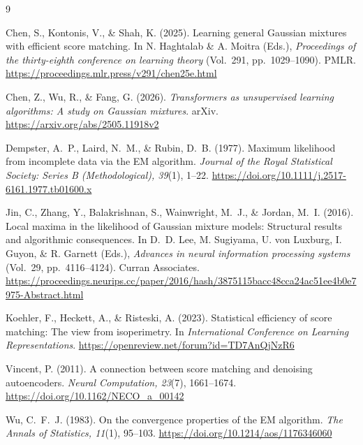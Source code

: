 \documentclass[a4paper,11pt]{article}
\numberwithin{equation}{section}
\begin{document}
\begingroup
\small
\setlength{\parskip}{2pt}
\begin{thebibliography}{9}

Chen, S., Kontonis, V., \& Shah, K. (2025).
Learning general Gaussian mixtures with efficient score matching.
In N. Haghtalab \& A. Moitra (Eds.),
\textit{Proceedings of the thirty-eighth conference on learning theory}
(Vol.~291, pp.~1029--1090). PMLR.
\url{https://proceedings.mlr.press/v291/chen25e.html}

Chen, Z., Wu, R., \& Fang, G. (2026).
\textit{Transformers as unsupervised learning algorithms: A study on Gaussian mixtures}.
arXiv.
\url{https://arxiv.org/abs/2505.11918v2}

Dempster, A.~P., Laird, N.~M., \& Rubin, D.~B. (1977).
Maximum likelihood from incomplete data via the EM algorithm.
\textit{Journal of the Royal Statistical Society: Series B (Methodological), 39}(1), 1--22.
\url{https://doi.org/10.1111/j.2517-6161.1977.tb01600.x}

Jin, C., Zhang, Y., Balakrishnan, S., Wainwright, M.~J., \& Jordan, M.~I. (2016).
Local maxima in the likelihood of Gaussian mixture models: Structural results and algorithmic consequences.
In D.~D. Lee, M. Sugiyama, U. von Luxburg, I. Guyon, \& R. Garnett (Eds.),
\textit{Advances in neural information processing systems}
(Vol.~29, pp.~4116--4124). Curran Associates.
\url{https://proceedings.neurips.cc/paper/2016/hash/3875115bacc48cca24ac51ee4b0e7975-Abstract.html}

Koehler, F., Heckett, A., \& Risteski, A. (2023).
Statistical efficiency of score matching: The view from isoperimetry.
In \textit{International Conference on Learning Representations}.
\url{https://openreview.net/forum?id=TD7AnQjNzR6}

Vincent, P. (2011).
A connection between score matching and denoising autoencoders.
\textit{Neural Computation, 23}(7), 1661--1674.
\url{https://doi.org/10.1162/NECO_a_00142}

Wu, C.~F.~J. (1983).
On the convergence properties of the EM algorithm.
\textit{The Annals of Statistics, 11}(1), 95--103.
\url{https://doi.org/10.1214/aos/1176346060}

\end{thebibliography}
\endgroup
\end{document}
